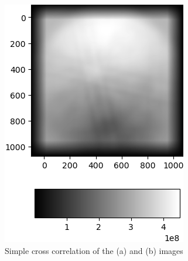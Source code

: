 \begin{figure}
\begin{subfigure}{.49\textwidth}
		\includegraphics[width=\linewidth]{img/normalized_simple_corr}
		\caption{Simple cross correlation of the (a) and (b) images}
		\label{2d-correlation-example-result}
	\end{subfigure}
	\begin{subfigure}{.49\textwidth}
		\centering

\end{subfigure}
\end{figure}
